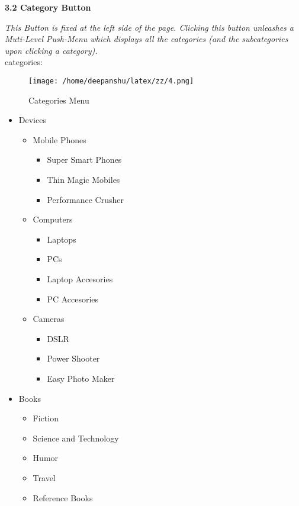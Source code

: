 \documentclass[a4paper,12pt]{article}
\begin{document}
\large{{\textbf{3.2 Category Button}} \vspace{5pt}

\normalsize \textsl {This Button is fixed at the left side of the page. Clicking this button unleashes a Muti-Level Push-Menu which displays all the categories (and the subcategories upon clicking a category). }\\
categories: \\


\begin{figure}[ht!]
\centering
\texttt{[image: /home/deepanshu/latex/zz/4.png]}
\caption{Categories Menu \label{overflow}}
\end{figure} 





\begin{itemize}
\item 
Devices
    \begin{itemize}
\item Mobile Phones
	  \begin{itemize}
	  \item Super Smart Phones
	  \item Thin Magic Mobiles
	  \item Performance Crusher
	  \end{itemize}
\item  Computers
	  \begin{itemize}
	  \item Laptops
	  \item PCs
	  \item Laptop Accesories
	  \item PC Accesories
	  \end{itemize}
\item  Cameras
	  \begin{itemize}
	  \item DSLR
	  \item Power Shooter
	  \item Easy Photo Maker
	  \end{itemize}
      \end{itemize}
\item  
Books
      \begin{itemize}
\item      Fiction
\item      Science and Technology
\item      Humor
\item      Travel
\item      Reference Books

\end{itemize}
\end{itemize}}
\end{document}
